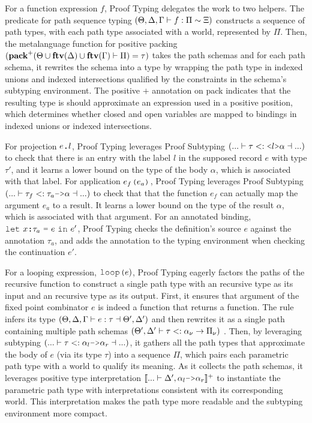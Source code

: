 \documentclass[acmsmall]{acmart}
\theoremstyle{definition}
\begin{document}
For a function expression $f$, Proof Typing 
delegates the work to two helpers. 
The predicate for path sequence typing 
$(\Theta, \Delta, \Gamma \vdash f : \Pi \sim \Xi)$
constructs a sequence of path types, 
with each path type associated with a world, represented by $\Pi$.
Then, the metalanguage function for positive packing 
$(\textbf{pack}^+(\Theta \cup \textbf{ftv}(\Delta) \cup \textbf{ftv}(\Gamma) \vdash \Pi) = \tau)$
takes the path schemas and for each path schema,
it rewrites the schema into a type by wrapping the path type in indexed unions
and indexed intersections qualified by the constraints in the schema's subtyping environment. 
The positive $+$ annotation on pack indicates that the resulting type 
is should approximate an expression used in a positive position,
which determines whether closed and open variables are mapped to
bindings in indexed unions or indexed intersections.

For projection $e\J{.}l$, Proof Typing
leverages Proof Subtyping $(... \entails \tau \subtypes \J{<}l\J{>}\alpha \given ...)$ 
to check that there is an entry with the label $l$ 
in the supposed record $e$ with type $\tau'$, 
and it learns a lower bound 
on the type of the body $\alpha$, which is associated with that label.
For application $e_f\J{(}e_a\J{)}$, Proof Typing
leverages Proof Subtyping $(... \entails \tau_f \subtypes \tau_a \J{->} \alpha \given ...)$
to check that that the function $e_f$ can actually
map the argument $e_a$ to a result. It learns a lower bound 
on the type of the result $\alpha$, which is associated with that argument.
For an annotated binding, $\J{let}\ x \J{:} \tau_a\ \J{=}\ e\ \J{in}\ e'$, 
Proof Typing checks the definition's source $e$ against the annotation $\tau_a$,
and adds the annotation to the typing environment when checking the continuation $e'$.

For a looping expression, $\J{loop(}e{)}$, Proof Typing
eagerly factors the paths of the recursive function 
to construct a single path type with an recursive type as its input and an recursive type as its output. 
First, it ensures that argument of the fixed point combinator $e$ is indeed a 
function that returns a function.
The rule infers its type $(\Theta, \Delta, \Gamma \vdash e : \tau \dashv  \Theta', \Delta')$
and then rewrites it as a single path containing multiple path schemas $(
  \Theta', \Delta' \vdash \tau <: \alpha_\nu \rightarrow \Pi_\nu
)$
. 
Then, by leveraging subtyping $(... \entails \tau \subtypes \alpha_l \J{->} \alpha_r \given ...)$, 
it gathers all the path types that approximate the body of $e$ (via its type $\tau$)
into a sequence $\Pi$, which pairs each parametric path type with a world to qualify its meaning.
As it collects the path schemas, it leverages positive type interpretation 
$\llbracket ... \entails \Delta', \alpha_l \J{->} \alpha_r \rrbracket^+$ 
to instantiate the parametric path type with interpretations consistent with its corresponding world. 
This interpretation makes the path type more readable and the subtyping environment more compact.
\end{document}
